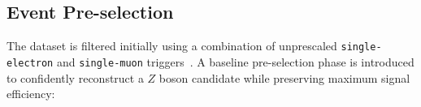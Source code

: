 

\subsection{Event Pre-selection}
\label{subsec:pre_selection}

The dataset is filtered initially using a combination of unprescaled \texttt{single-electron} and \texttt{single-muon} triggers~\cite{ATLAS:2020ejn}. A baseline pre-selection phase is introduced to confidently reconstruct a $Z$ boson candidate while preserving maximum signal efficiency:

